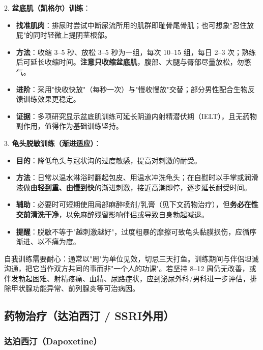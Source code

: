 2. \textbf{盆底肌（凯格尔）训练}：
  \begin{itemize}
  \item \textbf{找准肌肉}：排尿时尝试中断尿流所用的肌群即耻骨尾骨肌；也可想象"忍住放屁"的同时轻微上提阴茎根部。
  \item \textbf{方法}：收缩 3--5 秒、放松 3--5 秒为一组，每次 10--15 组，每日 2--3 次；熟练后可延长收缩时间。\textbf{注意只收缩盆底肌}，腹部、大腿与臀部尽量放松，勿憋气。
  \item \textbf{进阶}：采用"快收快放"（每秒一次）与"慢收慢放"交替；部分男性配合生物反馈训练效果更稳定。
  \item \textbf{证据}：多项研究显示盆底肌训练可延长阴道内射精潜伏期（IELT），且无药物副作用，值得作为基础训练坚持。
  \end{itemize}

3. \textbf{龟头脱敏训练（渐进适应）}：
  \begin{itemize}
  \item \textbf{目的}：降低龟头与冠状沟的过度敏感，提高对刺激的耐受。
  \item \textbf{方法}：日常以温水淋浴时翻起包皮、用温水冲洗龟头；在自慰时以手掌或润滑液做\textbf{由轻到重、由慢到快}的渐进刺激，接近高潮即停，逐步延长耐受时间。
  \item \textbf{辅助}：必要时可短期使用局部麻醉喷剂/乳膏（见下文药物治疗），但\textbf{务必在性交前清洗干净}，以免麻醉残留影响伴侣或导致自身勃起减退。
  \item \textbf{提醒}：脱敏不等于"越刺激越好"，过度粗暴的摩擦可致龟头黏膜损伤，应循序渐进、以不痛为度。
  \end{itemize}

\begin{tcolorbox}[colback=pink!5!white,colframe=red!50!black,title=贴心小叮咛]
自我训练需要耐心：通常以"周"为单位见效，切忌三天打鱼。训练期间与伴侣坦诚沟通，把它当作双方共同的事而非"一个人的功课"。若坚持 8--12 周仍无改善，或伴发勃起困难、射精疼痛、血精、尿路症状，应到泌尿外科/男科进一步评估，排除甲状腺功能异常、前列腺炎等可治病因。
\end{tcolorbox}

\subsection{药物治疗（达泊西汀 / SSRI外用）}

\subsubsection{达泊西汀（Dapoxetine）}

